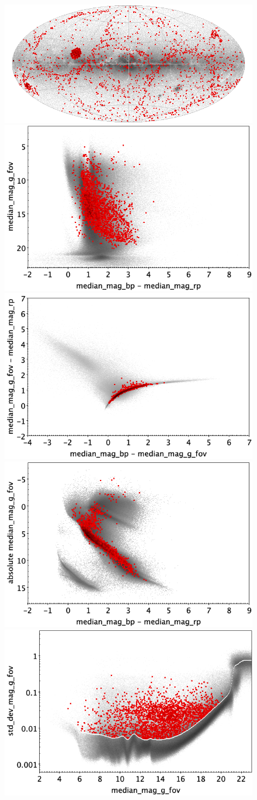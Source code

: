 \documentclass[longauth]{aa}
\begin{document}
\begin{appendix}
\begin{figure}
\centering
{} \includegraphics[width=0.6\hsize]{figures/appendix/SOLAR_trn_sky.png} \\ %
\vspace{4mm}
 \includegraphics[width=0.45\hsize]{figures/appendix/SOLAR_trn_cm.png}  %
\hspace{2mm}
 \includegraphics[width=0.45\hsize]{figures/appendix/SOLAR_trn_cc.png} \\ %
\vspace{4mm}
 \includegraphics[width=0.45\hsize]{figures/appendix/SOLAR_trn_cam.png}  %
\hspace{2mm}
 \includegraphics[width=0.45\hsize]{figures/appendix/SOLAR_trn_msd.png} \\ %

\end{figure}
\end{appendix}
\end{document}

